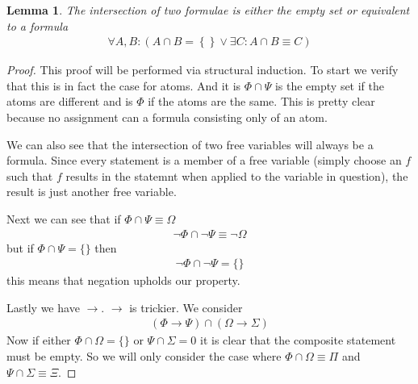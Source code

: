 \documentclass{article}
\newtheorem{lem}{Lemma}
\begin{document}
\begin{lem}
The intersection of two formulae is either the empty set or equivalent to a formula
\begin{align*}
\forall A,B : \left(A \cap B = \left\{\right\} \lor \exists C : A \cap B \equiv C \right)
\end{align*}
\end{lem}
\begin{proof}
This proof will be performed via structural induction.
To start we verify that this is in fact the case for atoms.
And it is $\Phi \cap \Psi$ is the empty set if the atoms are different and is $\Phi$ if the atoms are the same.
This is pretty clear because no assignment can a formula consisting only of an atom.

We can also see that the intersection of two free variables will always be a formula.
Since every statement is a member of a free variable (simply choose an $f$ such that $f$ results in the statemnt when applied to the variable in question),
the result is just another free variable.

Next we can see that if $\Phi \cap \Psi \equiv \Omega$
\begin{align*}
\neg \Phi \cap \neg \Psi \equiv \neg \Omega
\end{align*}
but if $\Phi \cap \Psi = \{\}$ then
\begin{align*}
\neg \Phi \cap \neg \Psi = \{\}
\end{align*}
this means that negation upholds our property.

Lastly we have $\rightarrow$.
$\rightarrow$ is trickier.
We consider
\begin{align*}
(\Phi \rightarrow \Psi) \cap (\Omega \rightarrow \Sigma)
\end{align*}
Now if either $\Phi \cap \Omega = \{\}$ or $\Psi \cap \Sigma = 0$ it is clear that the composite statement must be empty.
So we will only consider the case where $\Phi \cap \Omega \equiv \Pi$ and $\Psi \cap \Sigma \equiv \Xi$.


\end{proof}
\end{document}
